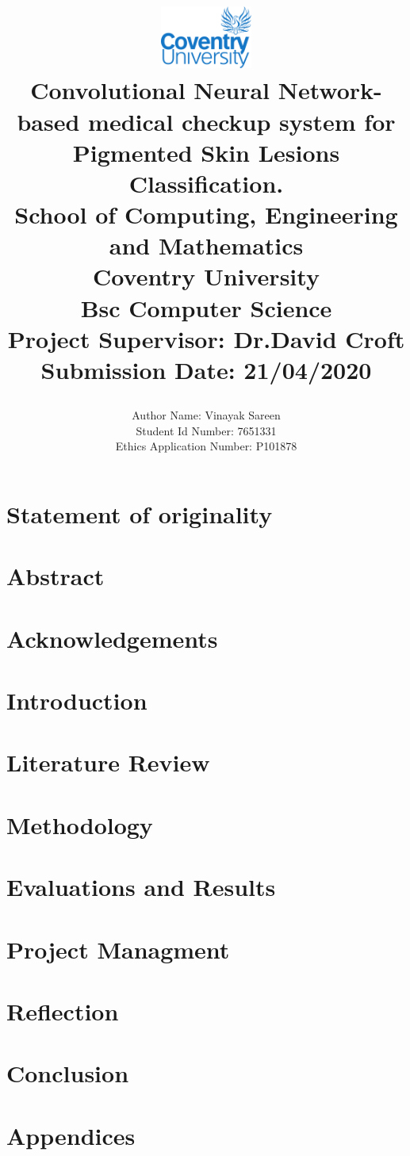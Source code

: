 \documentclass{report}
\title{
	\begin{center}
	\includegraphics[width=3cm]{Images/covlogo.png} \\
	\vspace{2mm}
	{Convolutional Neural Network-based medical checkup system for Pigmented Skin Lesions Classification.} \\
	\vspace{5mm} %
	\large {
		{School of Computing, Engineering and Mathematics}\\
		{Coventry University}\\
	}
	\vspace{3mm} %
	\textbf{ Bsc Computer Science}\\
	{\large Project Supervisor: Dr.David Croft}\\
	{\large Submission Date: 21/04/2020} \\
	\end{center}
}
\author{
	{\large Author Name:  Vinayak Sareen} \\
	{\large Student Id Number:  7651331} \\
	{\large Ethics Application Number: P101878 }\\
}
\date{}
\begin{document}
\maketitle

\chapter*{Statement of originality}


\chapter*{Abstract}


\tableofcontents

\chapter*{Acknowledgements}


\chapter{Introduction}


\chapter{Literature Review}


\chapter{Methodology}


\chapter{Evaluations and Results}


\chapter{Project Managment}


\chapter{Reflection}


\chapter{Conclusion}





\chapter*{Appendices}
% 
\end{document}

